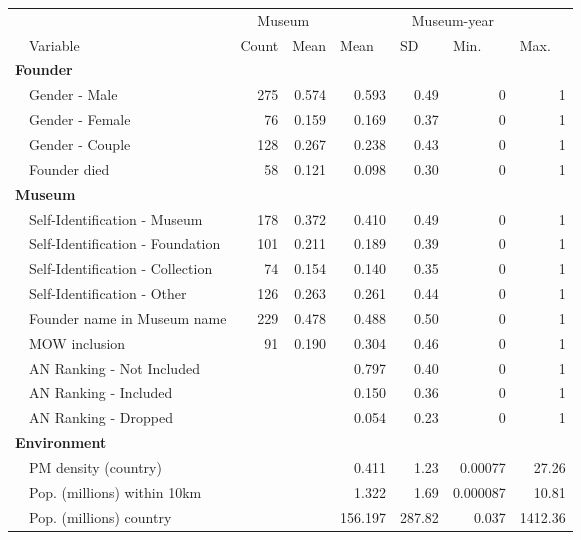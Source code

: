 \documentclass[12pt]{article}
\begin{document}
\begin{table}[ht]
\centering
\begin{tabular}{llrrrrrr}
  \hline
 & & \multicolumn{2}{c}{Museum} & \multicolumn{4}{c}{Museum-year} \\ 
\cmidrule(r){3-4}\cmidrule(r){5-8} \multicolumn{1}{l}{} & \multicolumn{1}{l}{Variable} & \multicolumn{1}{l}{Count} & \multicolumn{1}{l}{Mean} & \multicolumn{1}{l}{Mean} & \multicolumn{1}{l}{SD} & \multicolumn{1}{l}{Min.} & \multicolumn{1}{l}{Max.}\\ 
 \hline
  \multicolumn{8}{l}{\textbf{Founder}} \\ 
 & Gender - Male & 275 & 0.574 &   0.593 &   0.49 & 0 & 1 \\ 
   & Gender - Female & 76 & 0.159 &   0.169 &   0.37 & 0 & 1 \\ 
   & Gender - Couple & 128 & 0.267 &   0.238 &   0.43 & 0 & 1 \\ 
   & Founder died & 58 & 0.121 &   0.098 &   0.30 & 0 & 1 \\ 
   \multicolumn{8}{l}{\textbf{Museum}} \\ 
 & Self-Identification - Museum & 178 & 0.372 &   0.410 &   0.49 & 0 & 1 \\ 
   & Self-Identification - Foundation & 101 & 0.211 &   0.189 &   0.39 & 0 & 1 \\ 
   & Self-Identification - Collection & 74 & 0.154 &   0.140 &   0.35 & 0 & 1 \\ 
   & Self-Identification - Other & 126 & 0.263 &   0.261 &   0.44 & 0 & 1 \\ 
   & Founder name in Museum name & 229 & 0.478 &   0.488 &   0.50 & 0 & 1 \\ 
   & MOW inclusion & 91 & 0.190 &   0.304 &   0.46 & 0 & 1 \\ 
   & AN Ranking - Not Included &  &  &   0.797 &   0.40 & 0 & 1 \\ 
   & AN Ranking - Included &  &  &   0.150 &   0.36 & 0 & 1 \\ 
   & AN Ranking - Dropped &  &  &   0.054 &   0.23 & 0 & 1 \\ 
   \multicolumn{8}{l}{\textbf{Environment}} \\ 
 & PM density (country) &  &  &   0.411 &   1.23 & 0.00077 & 27.26 \\ 
   & Pop. (millions) within 10km &  &  &   1.322 &   1.69 & 0.000087 & 10.81 \\ 
   & Pop. (millions) country &  &  & 156.197 & 287.82 & 0.037 & 1412.36 \\ 

\end{tabular}
\end{table}
\end{document}
